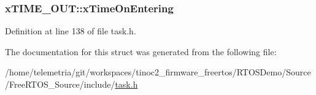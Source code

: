 \subsubsection[{\texorpdfstring{x\+Time\+On\+Entering}{xTimeOnEntering}}]{ x\+T\+I\+M\+E\+\_\+\+O\+U\+T\+::x\+Time\+On\+Entering}\hypertarget{structx_t_i_m_e___o_u_t_a3464939ca050f7bcc6ffe0d8d3766337}{}\label{structx_t_i_m_e___o_u_t_a3464939ca050f7bcc6ffe0d8d3766337}


Definition at line 138 of file task.\+h.



The documentation for this struct was generated from the following file\+:\begin{DoxyCompactItemize}
\item 
/home/telemetria/git/workspaces/tinoc2\+\_\+firmware\+\_\+freertos/\+R\+T\+O\+S\+Demo/\+Source/\+Free\+R\+T\+O\+S\+\_\+\+Source/include/\hyperlink{task_8h}{task.\+h}\end{DoxyCompactItemize}
